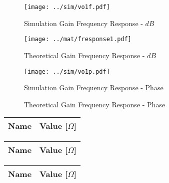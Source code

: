 \begin{figure}[H]
      \texttt{[image: ../sim/vo1f.pdf]}
      \caption{Simulation Gain Frequency Response - $dB$}
    \endminipage\hfill
      \texttt{[image: ../mat/fresponse1.pdf]}
      \caption{Theoretical Gain Frequency Response - $dB$}
    \endminipage\hfill
\end{figure}

\begin{figure}[H]
      \texttt{[image: ../sim/vo1p.pdf]}
      \caption{Simulation Gain Frequency Response - Phase}
    \endminipage\hfill
      \caption{Theoretical Gain Frequency Response - Phase}
    \endminipage\hfill
\end{figure}

\begin{center}
  \begin{tabular}{ | c | c | }
    \hline    
    {\bf Name} & {\bf Value [$\Omega$]} \\ \hline
    
  \end{tabular}
\end{center}

\begin{center}
  \begin{tabular}{ | c | c | }
    \hline    
    {\bf Name} & {\bf Value [$\Omega$]} \\ \hline
    
  \end{tabular}
\end{center}

\begin{center}
  \begin{tabular}{ | c | c | }
    \hline    
    {\bf Name} & {\bf Value [$\Omega$]} \\ \hline
    
    \hline
  \end{tabular}
\end{center}



